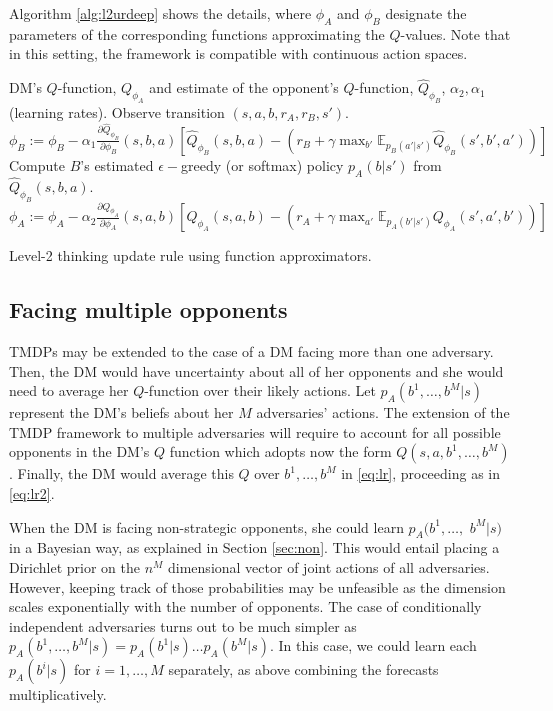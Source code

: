 Algorithm \ref{alg:l2urdeep} shows the details, where $\phi_A$ and $\phi_B$ designate the parameters of the corresponding functions approximating the $Q$-values. Note that in this setting,
the framework is compatible with continuous action spaces.

\begin{algorithm*}[!ht]
\begin{algorithmic}[1]
\Require DM's $Q$-function, $Q_{\phi_A}$ and estimate of the opponent's $Q$-function, $\hat{Q}_{\phi_B}$, $\alpha_2, \alpha_1$ (learning rates).
\State Observe  transition $(s, a, b, r_A, r_B, s')$.
\State $\phi_B := \phi_B - \alpha_1 \frac{\partial \hat{Q}_{\phi_B}}{\partial \phi_B}(s, b,a)\left[ \hat{Q}_{\phi_B}(s,b,a) - (r_B + \gamma \max_{b'}\mathbb{E}_{p_B(a'|s')} \hat{Q}_{\phi_B} (s', b',a') ) \right]  $
\State Compute $B$'s estimated $\epsilon-$greedy (or softmax) policy $p_A(b|s')$ from $\hat{Q}_{\phi_B}(s,b,a)$.
\State $\phi_A := \phi_A - \alpha_2 \frac{\partial Q_{\phi_A}}{\partial \phi_A}(s, a,b) \left[ Q_{\phi_A}(s,a,b) - (r_A + \gamma \max_{a'}\mathbb{E}_{p_A(b'|s')} Q_{\phi_A} (s', a',b') ) \right]  $ 
\end{algorithmic}
\caption{Level-2 thinking update rule using function approximators.}
\label{alg:l2urdeep}
\end{algorithm*}

\subsection{Facing multiple opponents}\label{sec:mul}
%
TMDPs may be extended to the case of a DM facing more than one adversary. Then, the DM would have uncertainty about all of her opponents and she would need to average her $Q$-function over their
likely actions. Let $p_A(b^1, \dots, b^M \vert s)$ represent the DM's beliefs about her $M$ adversaries' actions. The extension of the TMDP framework to multiple adversaries will require to account for all possible opponents in the DM's $Q$ function which adopts now the form $Q(s,a,b^1,\dots,b^M)$. Finally, the DM would average this $Q$ over $b^1, \dots, b^M$ in \eqref{eq:lr}, proceeding as in \eqref{eq:lr2}.

When the DM is facing non-strategic opponents, she could learn $p_A(b^1, \dots,$ $ b^M \vert s)$ in a Bayesian way, as explained in Section \ref{sec:non}. This would entail placing a Dirichlet prior on the $n^M$ dimensional vector of joint actions of all adversaries. However, keeping track of those probabilities may be unfeasible as the dimension scales exponentially with the number of opponents. The case  of conditionally independent adversaries turns out to be much simpler as
$p_A(b^1, \dots, b^M \vert s) = p_A(b^1 \vert s) \dots p_A(b^M \vert s)$. In this case, we could learn each $p_A(b^i \vert s)$ for $i=1, \dots, M$ separately, as above combining the forecasts  
multiplicatively.

